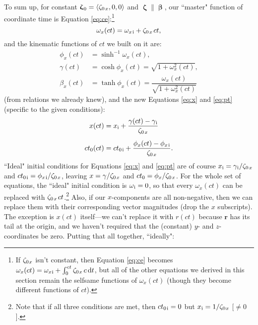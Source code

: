 \documentclass[12pt]{article}
\renewcommand{\vv}[1]{\mathbf{#1}}
\newcommand{\dd}[1]{\mathrm{d}#1}
\newcommand{\vvbeta}{\bm{\upbeta}}
\newcommand{\vvzeta}{\bm{\upzeta}}
\begin{document}
To sum up, for constant $\vvzeta_{\mkern1mu 0} = \langle \zeta_{0 \mkern2mu x} , 0, 0 \rangle$ and $\vvzeta \parallel \vvbeta$, our ``master" function of coordinate time is Equation \ref{eq:ce}:\footnote{If $\zeta_{0 \mkern1mu x}$ isn't constant, then Equation \ref{eq:ce} becomes $\omega_x (ct) = \omega_{x \mkern1mu \textrm{i} } + \int_0^{ct} \zeta_{0 \mkern1mu x} \, c \, \dd t$, but all of the other equations we derived in this section remain the selfsame functions of $\omega_x (ct)$ (though they become different functions of $ct$).}
\begin{equation*}
\omega_x (ct) = \omega_{x \mkern2mu \textrm{i} } + \zeta_{0 \mkern2mu x} \mkern2mu ct ,
\end{equation*}
and the kinematic functions of $ct$ we built on it are:
\begin{equation*}
\begin{aligned}
\phi_x (ct) &= \sinh^{-1} \omega_x (ct) , \\[5pt]
\gamma (ct) &= \cosh \phi_x(ct) = \sqrt{1 + \omega^2_x (ct)} , \\[3pt]
\beta_x (ct) &= \tanh \phi_x(ct) = \dfrac{\omega_x (ct)}{\sqrt{1 + \omega^2_x (ct)}}
\end{aligned}
\end{equation*}
(from relations we already knew), and the new Equations \ref{eq:x} and \ref{eq:pt} (specific to the given conditions):
\begin{equation*}
\begin{aligned}
x (ct) &= x_{\mathrm{i}} + \dfrac{ \gamma (ct) - \gamma_{\mkern1mu \mathrm{i}} }{ \zeta_{0 \mkern2mu x}} \\[5pt]
ct_0 (ct) &= ct_{0 \mkern2mu \mathrm{i}} + \dfrac{ \phi_x (ct) - \phi_{x \mkern2mu \mathrm{i} }}{ \zeta_{0 \mkern2mu x}} .
\end{aligned}
\end{equation*}
``Ideal" initial conditions for Equations \ref{eq:x} and \ref{eq:pt} are of course $x_{\mathrm{i}} = \gamma_{\mkern1mu \mathrm{i}} / \zeta_{0 \mkern2mu x}$ and $ct_{0 \mkern2mu \mathrm{i}} = \phi_{x \mkern2mu \mathrm{i} } / \zeta_{0 \mkern2mu x}$, leaving $x = \gamma / \zeta_{0 \mkern2mu x}$ and $ct_0 = \phi_x / \zeta_{0 \mkern2mu x}$. For the whole set of equations, the ``ideal" initial condition is $\omega_{\mkern1mu \textrm{i}} = 0$, so that every $\omega_x (ct)$ can be replaced with $\zeta_{0 \mkern2mu x} \mkern2mu ct$.\footnote{Note that if all three conditions are met, then $ct_{0 \mkern2mu \mathrm{i}} = 0$ but $x_{\mathrm{i}} = 1 / \zeta_{0 \mkern1mu x}$ [$\neq 0$].} Also, if our $x$-components are all non-negative, then we can replace them with their corresponding vector magnitudes (drop the $x$ subscripts). The exception is $x(ct)$ itself---we can't replace it with $r(ct)$ because $\vv r$ has its tail at the origin, and we haven't required that the (constant) $y$- and $z$-coordinates be zero. Putting that all together, ``ideally":
\end{document}
